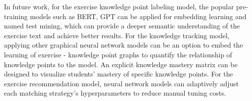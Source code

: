In future work, for the exercise knowledge point labeling model, the popular pre-training models such as BERT, GPT can be applied for embedding learning and named test mining, which can provide a deeper semantic understanding of the exercise text and achieve better results. For the knowledge tracking model, applying other graphical neural network models can be an option to embed the learning of exercise - knowledge point graphs to quantify the relationship of knowledge points to the model. An explicit knowledge mastery matrix can be designed to visualize students' mastery of specific knowledge points. For the exercise recommendation model, neural network models can adaptively adjust each matching strategy's hyperparameters to reduce manual tuning costs.